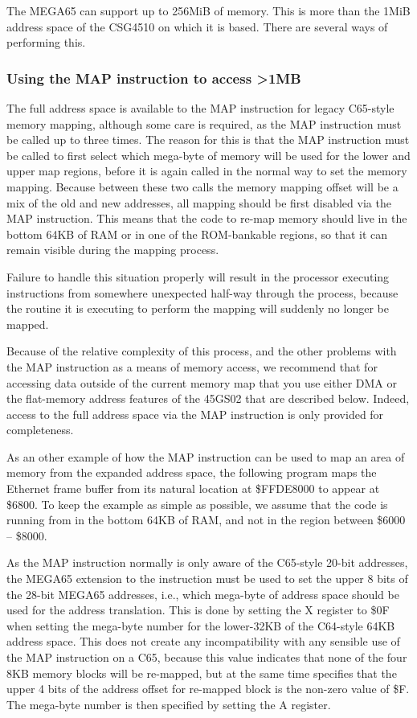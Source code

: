 The MEGA65 can support up to 256MiB of memory. This is more than the 1MiB address space of the CSG4510
on which it is based. There are several ways of performing this.

\subsubsection{Using the MAP instruction to access >1MB}

The full address space is available to the MAP instruction for legacy C65-style memory
mapping, although some care is required, as the MAP instruction must be called up to three times.
The reason for this is that the MAP instruction must be called to first select which mega-byte of
memory will be used for the lower and upper map regions, before it is again called in the normal
way to set the memory mapping.  Because between these two calls the memory mapping offset will be
a mix of the old and new addresses, all mapping should be first disabled via the MAP instruction.
This means that the code to re-map memory should live in the bottom 64KB of RAM or in one of the
ROM-bankable regions, so that it can remain visible during the mapping process.

Failure to handle this situation properly will result in the processor executing instructions
from somewhere unexpected half-way through the process, because the routine it is executing
to perform the mapping will suddenly no longer be mapped.

Because of the relative complexity of this process, and the other problems with the MAP instruction
as a means of memory access, we recommend that for accessing data outside of the current memory
map that you use either DMA or the flat-memory address features of the 45GS02 that are described below.
Indeed, access to the full address space via the MAP instruction is only provided for completeness.

As an other example of how the MAP instruction can be used to map an area of memory from
the expanded address space, the following program maps the Ethernet frame buffer from its natural location
at \$FFDE8000 to appear at \$6800.  To keep the example as simple as possible, we assume that the code
is running from in the bottom 64KB of RAM, and not in the region between \$6000 -- \$8000.

As the MAP instruction normally is only aware of the C65-style 20-bit addresses, the MEGA65 extension to the
instruction must be used to set the upper 8 bits of the 28-bit MEGA65 addresses, i.e., which mega-byte of address
space should be used for the address translation.  This is done by setting the X
register to \$0F when setting the mega-byte number for the lower-32KB of the C64-style 64KB address space.
This does not create any incompatibility with any sensible use of the MAP instruction on a C65, because this
value indicates that none of the four 8KB memory blocks will be re-mapped, but at the same time specifies that
the upper 4 bits of the address offset for re-mapped block is the non-zero value of \$F.  The mega-byte number
is then specified by setting the A register.

